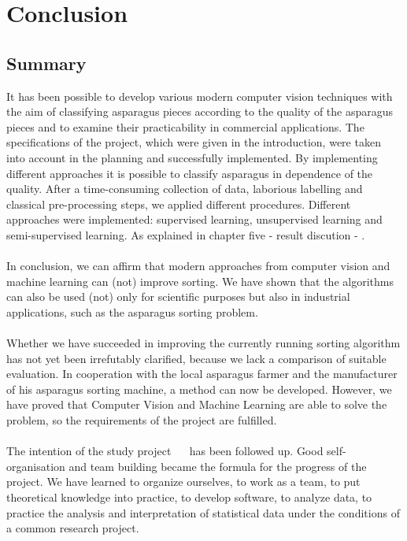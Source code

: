 \section{Conclusion}
\label{ch:Conclusion}


\subsection{Summary}
\label{sec:Summary}

It has been possible to develop various modern computer vision techniques with the aim of classifying asparagus pieces according to the quality of the asparagus pieces and to examine their practicability in commercial applications. The specifications of the project, which were given in the introduction, were taken into account in the planning and successfully implemented. By implementing different approaches it is possible to classify asparagus in dependence of the quality. After a time-consuming collection of data, laborious labelling and classical pre-processing steps, we applied different procedures. Different approaches were implemented: supervised learning, unsupervised learning and semi-supervised learning. As explained in chapter five - result discution - . \\
\\
In conclusion, we can affirm that modern approaches from computer vision and machine learning can (not) improve sorting. We have shown that the algorithms can also be used (not) only for scientific purposes but also in industrial applications, such as the asparagus sorting problem. \\
\\
Whether we have succeeded in improving the currently running sorting algorithm has not yet been irrefutably clarified, because we lack a comparison of suitable evaluation. In cooperation with the local asparagus farmer and the manufacturer of his asparagus sorting machine, a method can now be developed. However, we have proved that Computer Vision and Machine Learning are able to solve the problem, so the requirements of the project are fulfilled. \\
\\
The intention of the study project ~\citep{ studyregulations}~\citep{moduledescription} has been followed up. Good self-organisation and team building became the formula for the progress of the project. We have learned to organize ourselves, to work as a team, to put theoretical knowledge into practice, to develop software, to analyze data, to practice the analysis and interpretation of statistical data under the conditions of a common research project.


